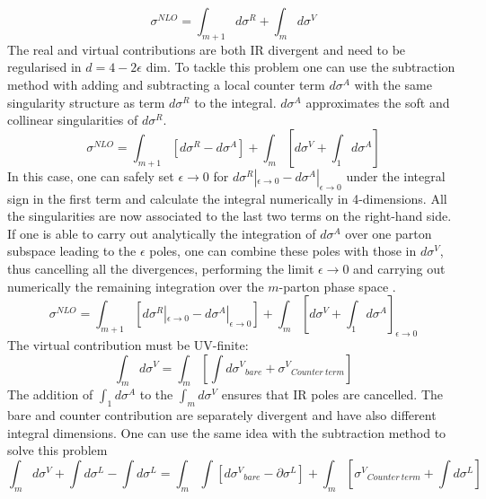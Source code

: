 \begin{equation}
\sigma^{NLO} = \int_{m+1} d \sigma^R +\int_{m} d \sigma^V
\end{equation}
The real and virtual contributions are both IR divergent and need to be regularised in $ d = 4-2\epsilon $ dim.
To tackle this problem one can use the subtraction method with adding and subtracting a local counter term $ d \sigma^A $ with the same singularity structure as term $ d \sigma^R $ to the integral. $ d \sigma^A $ approximates the soft and collinear singularities of $ d \sigma^R  $.
\begin{equation}
\sigma^{NLO} = \int_{m+1} [d \sigma^R -d \sigma^A]+\int_{m} [d \sigma^V+\int_1 d \sigma^A]
\end{equation}
In this case, one can safely set $ \epsilon \rightarrow 0 $ for $ d \sigma^R |_{\epsilon \rightarrow 0}  -d \sigma^A |_{\epsilon \rightarrow 0} $ under the integral sign in the first term and calculate the integral numerically in 4-dimensions. All the singularities are now associated to the last two terms on the right-hand side. If one is able to carry out analytically the integration of $ d \sigma^A $ over one parton subspace leading to the $ \epsilon $ poles, one can combine these poles with those in $ d \sigma^V $, thus cancelling all the divergences, performing the limit $ {\epsilon \rightarrow 0} $ and carrying out numerically the remaining integration over the $ m $-parton phase space \cite{Catani:2002hc}. 
\begin{equation}
\sigma^{NLO} = \int_{m+1} [d \sigma^R |_{\epsilon \rightarrow 0}  -d \sigma^A |_{\epsilon \rightarrow 0}]+\int_{m} [d \sigma^V+\int_1 d \sigma^A]_{\epsilon \rightarrow 0}
\end{equation}
The virtual contribution must be UV-finite:
\begin{equation}
\int_{m} d \sigma^V= \int_m [\int d {\sigma^V}_{bare} + {\sigma^V}_{Counter\:term}]
\end{equation}
The addition of $\int_1 d \sigma^A$ to the $ \int_{m} d \sigma^V $ ensures that IR poles are cancelled.
The bare and counter contribution are separately divergent and have also different integral dimensions. One can use the same idea with the subtraction method to solve this problem~\cite{Catani:1996vz}
\begin{equation}
\int_{m} d \sigma^V +\int d {\sigma^L}-\int d {\sigma^L}= \int_m \int[ d {\sigma^V}_{bare}- \partial {\sigma^L}] + \int_m[{\sigma^V}_{Counter\:term}+ \int d {\sigma^L}]
\end{equation}


